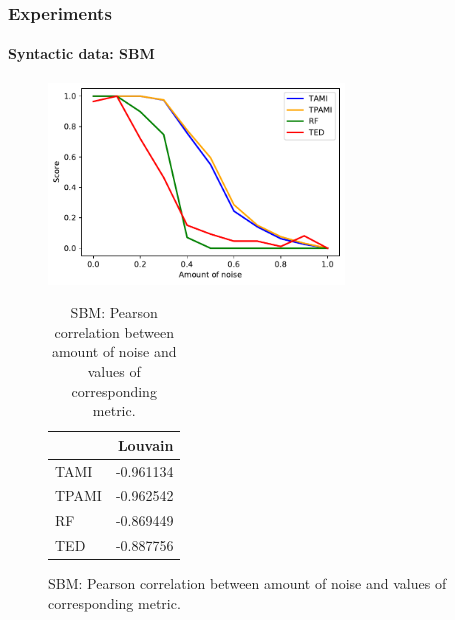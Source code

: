 \documentclass{tum-presentation}
\begin{document}
\begin{frame} 
	\frametitle{Experiments}
	\framesubtitle{Syntactic data: SBM}
	\begin{figure}[H]
		\centering
		\begin{minipage}{.6\textwidth}
			\begin{center}
				\includegraphics[width=0.7\textwidth]{../figures/2-block-model-sbm-Louvain.pdf}			
				\caption{Similarity results on the Louvain dendrogram.}
			\end{center}
		\end{minipage}%
		\begin{minipage}{0.4\textwidth}
			\begin{table}
				\centering
				\caption{SBM: Pearson correlation between amount of noise and values of corresponding metric.}
				\begin{tabular}{lr}
					\toprule
					{} &    Louvain  \\
					\midrule
					TAMI  & -0.961134 \\
					TPAMI & -0.962542 \\
					RF    & -0.869449 \\
					TED   & -0.887756 \\
					\bottomrule
				\end{tabular}
			\end{table}
		\end{minipage}
	\end{figure}
\end{frame}
\end{document}
